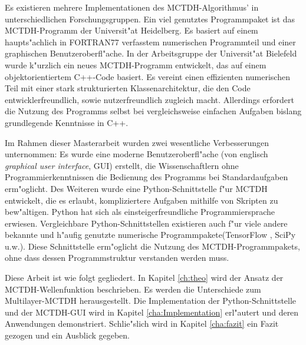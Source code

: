 Es existieren mehrere Implementationen des MCTDH-Algorithmus' in unterschiedlich\-en Forschungsgruppen.
Ein viel genutztes Programmpaket ist das MCTDH-Programm der Universit"at Heidelberg\cite{Heidelberg}. Es
basiert auf einem haupts"achlich in FORTRAN77 verfasstem numerischen Programmteil und einer
graphischen Benutzeroberfl"ache. In der Arbeitsgruppe der Universit"at Bielefeld wurde k"urzlich
ein neues MCTDH-Programm entwickelt, das auf einem objektorientiertem C++-Code basiert.
Es vereint einen effizienten numerischen Teil mit einer stark strukturierten Klassenarchitektur,
die den Code entwicklerfreundlich, sowie nutzerfreundlich zugleich macht. Allerdings erfordert
die Nutzung des Programms selbst bei vergleichsweise einfachen Aufgaben bislang
grundlegende Kenntnisse in C++.

Im Rahmen dieser Masterarbeit wurden zwei wesentliche Verbesserungen unternommen: 
Es wurde eine moderne Benutzeroberfl"ache (von englisch \textit{graphical user interface}, GUI) erstellt,
die Wissenschaftlern ohne Programmierkenntnissen die Bedienung des Programms bei Standardaufgaben erm"oglicht.
Des Weiteren wurde eine Python-Schnittstelle f"ur MCTDH entwickelt,
die es erlaubt, kompliziertere Aufgaben mithilfe von Skripten zu bew"altigen.
Python hat sich als einsteigerfreundliche Programmiersprache erwiesen. 
Vergleichbare Python-Schnittstellen existieren auch f"ur viele andere bekannte und h"aufig genutzte 
numerische Programmpakete(TensorFlow \cite{TensorFlow}, SciPy \cite{SciPy} u.w.).
Diese Schnittstelle erm"oglicht die Nutzung des MCTDH-Programmpakets, ohne dass 
dessen Programmstruktur verstanden werden muss.
 
Diese Arbeit ist wie folgt gegliedert. In Kapitel \ref{ch:theo} wird der Ansatz der MCTDH-Wellenfunk\-tion beschrieben. 
Es werden die Unterschiede zum Multilayer-MCTDH herausgestellt. Die Implementation der
Python-Schnittstelle und der MCTDH-GUI wird
in Kapitel \ref{cha:Implementation} erl"autert und deren Anwendungen demonstriert.
Schlie"slich wird in Kapitel \ref{cha:fazit} ein Fazit gezogen und ein Ausblick gegeben.     
